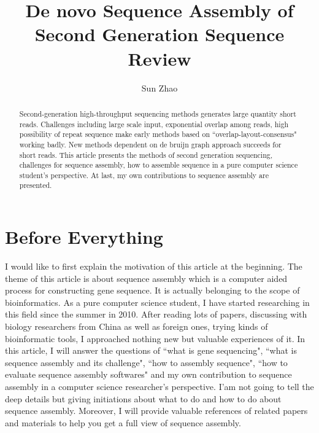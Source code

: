 \documentclass{article}
\title{De novo Sequence Assembly of Second Generation Sequence Review}
\author{Sun Zhao}
\begin{document}
\maketitle
\newpage

\begin{abstract}
Second-generation high-throughput sequencing methods generates large quantity short reads. Challenges including large scale input, exponential overlap among reads, high possibility of repeat sequence make early methods based on ``overlap-layout-consensus" working badly. New methods dependent on de bruijn graph approach succeeds for short reads. This article presents the methods of second generation sequencing, challenges for sequence assembly, how to assemble sequence in a pure computer science student's perspective. At last, my own contributions to sequence assembly are presented.
\end{abstract}

\section{Before Everything}
I would like to first explain the motivation of this article at the beginning. The theme of this article is about sequence assembly which is a computer aided process for constructing gene sequence. It is actually belonging to the scope of bioinformatics. As a pure computer science student, I have started researching in this field since the summer in 2010. After reading lots of papers, discussing with biology researchers from China as well as foreign ones, trying kinds of bioinformatic tools, I approached nothing new but valuable experiences of it. In this article, I will answer the questions of ``what is gene sequencing", ``what is sequence assembly and its challenge", ``how to assembly sequence", ``how to evaluate sequence assembly softwares" and my own contribution to sequence assembly in a computer science researcher's perspective. I'am not going to tell the deep details but giving initiations about what to do and how to do about sequence assembly. Moreover, I will provide valuable references of related papers and materials to help you get a full view of sequence assembly.
\end{document}
